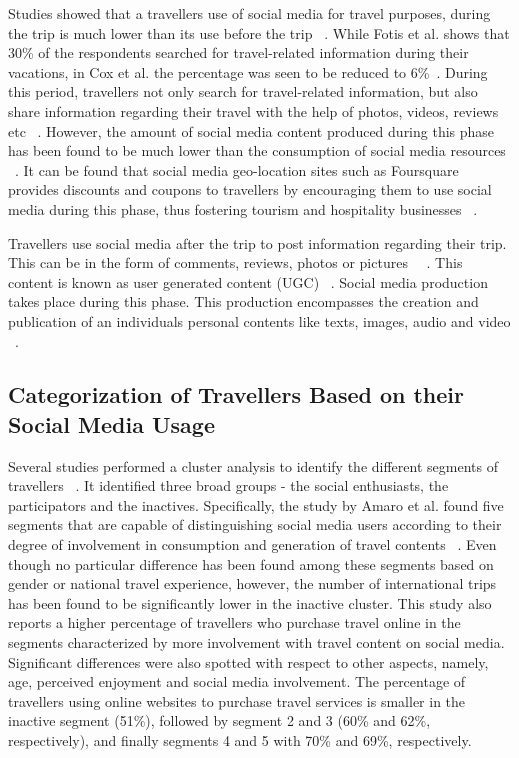 Studies showed that a traveller\textquotesingle s use of social media for travel purposes, during the trip is much lower than its use before the trip ~\cite{cox2009role, fotis2012social}. While Fotis et al. shows that 30\% of the respondents searched for travel-related information during their vacations, in Cox et al. the percentage was seen to be reduced to 6\%~\cite{fotis2012social, cox2009role}. During this period, travellers not only search for travel-related information, but also share information regarding their travel with the help of photos, videos, reviews etc ~\cite{amaro2016travelers}. However, the amount of social media content produced during this phase has been found to be much lower than the consumption of social media resources ~\cite{fotis2012social}. It can be found that social media geo-location sites such as Foursquare provides discounts and coupons to travellers by encouraging them to use social media during this phase, thus fostering tourism and hospitality businesses ~\cite{hudson2013impact}.

Travellers use social media after the trip to post information regarding their trip. This can be in the form of comments, reviews, photos or pictures ~\cite{fotis2012social}~\cite{parra2012travellers}. This content is known as user generated content (UGC) ~\cite{simms2012online}. Social media production takes place during this phase. This production encompasses the creation and publication of an individual\textquotesingle s personal contents like texts, images, audio and video ~\cite{shao2009understanding}. 


\subsection{Categorization of Travellers Based on their Social Media Usage}\label{2.3}

Several studies performed a cluster analysis to identify the different segments of travellers~\cite{chiu2012china, foster2011exploring, kurtulucs2015social} . It identified three broad groups - the social enthusiasts, the participators and the inactives. Specifically, the study by Amaro et al. found five segments that are capable of distinguishing social media users according to their degree of involvement in consumption and generation of travel contents ~\cite{amaro2016travelers}. Even though no particular difference has been found among these segments based on gender or national travel experience, however, the number of international trips has been found to be significantly lower in the inactive cluster. This study also reports a higher percentage of travellers who purchase travel online in the segments characterized by more involvement with travel content on social media. Significant differences were also spotted with respect to other aspects, namely, age, perceived enjoyment and social media involvement. 	The percentage of travellers using online websites to purchase travel services is smaller in the inactive segment (51\%), followed by segment 2 and 3 (60\% and 62\%, respectively), and finally segments 4 and 5 with 70\% and 69\%, respectively.

